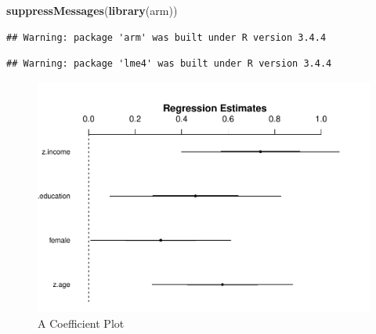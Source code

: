 \documentclass[11pt,]{article}
\newenvironment{Shaded}{\begin{snugshade}}{\end{snugshade}}
\newcommand{\DataTypeTok}[1]{\textcolor[rgb]{0.13,0.29,0.53}{#1}}
\newcommand{\KeywordTok}[1]{\textcolor[rgb]{0.13,0.29,0.53}{\textbf{#1}}}
\newcommand{\NormalTok}[1]{#1}
\newcommand{\OperatorTok}[1]{\textcolor[rgb]{0.81,0.36,0.00}{\textbf{#1}}}
\newcommand{\StringTok}[1]{\textcolor[rgb]{0.31,0.60,0.02}{#1}}
\begin{document}
\begin{Shaded}
\begin{Highlighting}[]
\KeywordTok{suppressMessages}\NormalTok{(}\KeywordTok{library}\NormalTok{(arm))}
\end{Highlighting}
\end{Shaded}

\begin{verbatim}
## Warning: package 'arm' was built under R version 3.4.4
\end{verbatim}

\begin{verbatim}
## Warning: package 'lme4' was built under R version 3.4.4
\end{verbatim}

\begin{Shaded}
\end{Shaded}

\begin{figure}
\centering
\includegraphics{describe_FSMintentions_regional_seasonal_iDE-Camb_surveysOct2017_files/figure-latex/unnamed-chunk-3-1.pdf}
\caption{A Coefficient Plot}
\end{figure}
\end{document}
